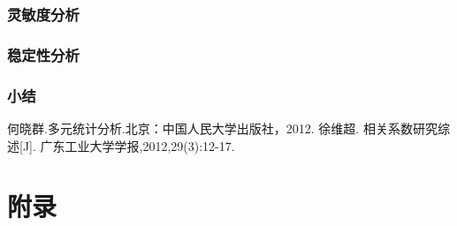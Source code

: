 \documentclass{ctexart}
\begin{document}
\subsubsection{灵敏度分析}
\subsubsection{稳定性分析}
\subsubsection{小结}
    \begin{thebibliography}{9} %
		何晓群.多元统计分析.北京：中国人民大学出版社，2012.
		徐维超. 相关系数研究综述[J]. 广东工业大学学报,2012,29(3):12-17.
    \end{thebibliography}

    \newpage
    \section{附录}
\begin{lstlisting}
		\end{lstlisting}
\end{document}
